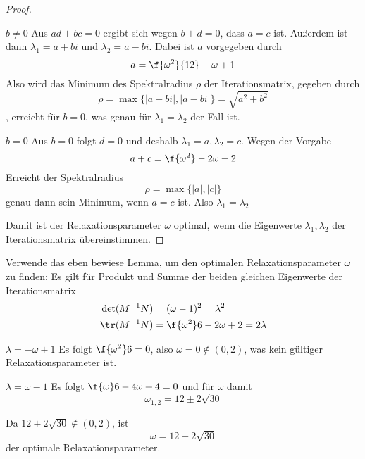 \documentclass{scrartcl}
\begin{document}
\begin{aufgabe}
\begin{lem*}
\begin{proof}
				\begin{seg}{$b\neq 0$}
					Aus $ad+bc=0$ ergibt sich wegen $b+d=0$, dass $a=c$ ist.
					Außerdem ist dann $\lambda_1=a+bi$ und $\lambda_2=a-bi$.
					Dabei ist $a$ vorgegeben durch
					\[
						a = \f{\omega^2}{12}-\omega+1
					\]
					Also wird das Minimum des Spektralradius $\rho$ der Iterationsmatrix, gegeben durch
					\[
						\rho = \max\{|a+bi|, |a-bi|\} = \sqrt{a^2+b^2}
					\]
					, erreicht für $b=0$, was genau für $\lambda_1=\lambda_2$ der Fall ist.
				\end{seg}
				\begin{seg}{$b=0$}
					Aus $b=0$ folgt $d=0$ und deshalb $\lambda_1=a, \lambda_2=c$.
					Wegen der Vorgabe
					\[
						a+c = \f{\omega^2} - 2\omega + 2
					\]
					Erreicht der Spektralradius
					\[
						\rho = \max\{|a|,|c|\}
					\]
					genau dann sein Minimum, wenn $a=c$ ist.
					Also $\lambda_1=\lambda_2$
				\end{seg}
				Damit ist der Relaxationsparameter $\omega$ optimal, wenn die Eigenwerte $\lambda_1,\lambda_2$ der Iterationsmatrix übereinstimmen.
			\end{proof}
		\end{lem*}
		Verwende das eben bewiese Lemma, um den optimalen Relaxationsparameter $\omega$ zu finden:
		Es gilt für Produkt und Summe der beiden gleichen Eigenwerte der Iterationsmatrix
		\begin{align*}
			\det(M^{-1}N) &= (\omega-1)^2 = \lambda^2\\
			\tr(M^{-1}N) &= \f{\omega^2}6-2\omega+2 = 2\lambda
		\end{align*}
		\newpage
		\begin{seg}{$\lambda = -\omega+1$}
			Es folgt $\f{\omega^2}6 = 0$, also $\omega=0\not\in(0,2)$, was kein gültiger Relaxationsparameter ist.
		\end{seg}
		\begin{seg}{$\lambda = \omega-1$}
			Es folgt $\f{\omega}6-4\omega +4 = 0$ und für $\omega$ damit
			\[
				\omega_{1,2} = 12 \pm 2\sqrt{30}
			\]
		\end{seg}
		Da $12+2\sqrt{30}\not\in (0,2)$, ist
		\[
			\omega = 12 - 2\sqrt{30}
		\]
		der optimale Relaxationsparameter.
	\end{aufgabe}
\end{document}
